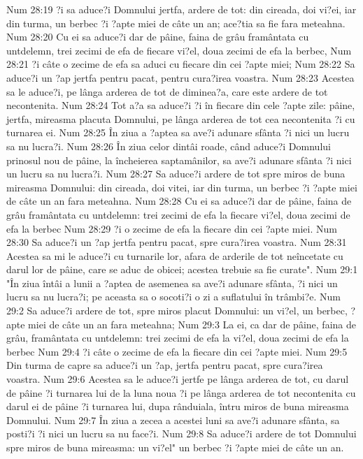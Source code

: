 Num 28:19  ?i sa aduce?i Domnului jertfa, ardere de tot: din cireada, doi vi?ei, iar din turma, un berbec ?i ?apte miei de câte un an; ace?tia sa fie fara meteahna.
Num 28:20  Cu ei sa aduce?i dar de pâine, faina de grâu framântata cu untdelemn, trei zecimi de efa de fiecare vi?el, doua zecimi de efa la berbec,
Num 28:21  ?i câte o zecime de efa sa aduci cu fiecare din cei ?apte miei;
Num 28:22  Sa aduce?i un ?ap jertfa pentru pacat, pentru cura?irea voastra.
Num 28:23  Acestea sa le aduce?i, pe lânga arderea de tot de diminea?a, care este ardere de tot necontenita.
Num 28:24  Tot a?a sa aduce?i ?i în fiecare din cele ?apte zile: pâine, jertfa, mireasma placuta Domnului, pe lânga arderea de tot cea necontenita ?i cu turnarea ei.
Num 28:25  În ziua a ?aptea sa ave?i adunare sfânta ?i nici un lucru sa nu lucra?i.
Num 28:26  În ziua celor dintâi roade, când aduce?i Domnului prinosul nou de pâine, la încheierea saptamânilor, sa ave?i adunare sfânta ?i nici un lucru sa nu lucra?i.
Num 28:27  Sa aduce?i ardere de tot spre miros de buna mireasma Domnului: din cireada, doi vitei, iar din turma, un berbec ?i ?apte miei de câte un an fara meteahna.
Num 28:28  Cu ei sa aduce?i dar de pâine, faina de grâu framântata cu untdelemn: trei zecimi de efa la fiecare vi?el, doua zecimi de efa la berbec
Num 28:29  ?i o zecime de efa la fiecare din cei ?apte miei.
Num 28:30  Sa aduce?i un ?ap jertfa pentru pacat, spre cura?irea voastra.
Num 28:31  Acestea sa mi le aduce?i cu turnarile lor, afara de arderile de tot neîncetate cu darul lor de pâine, care se aduc de obicei; acestea trebuie sa fie curate".
Num 29:1  "În ziua întâi a lunii a ?aptea de asemenea sa ave?i adunare sfânta, ?i nici un lucru sa nu lucra?i; pe aceasta sa o socoti?i o zi a suflatului în trâmbi?e.
Num 29:2  Sa aduce?i ardere de tot, spre miros placut Domnului: un vi?el, un berbec, ?apte miei de câte un an fara meteahna;
Num 29:3  La ei, ca dar de pâine, faina de grâu, framântata cu untdelemn: trei zecimi de efa la vi?el, doua zecimi de efa la berbec
Num 29:4  ?i câte o zecime de efa la fiecare din cei ?apte miei.
Num 29:5  Din turma de capre sa aduce?i un ?ap, jertfa pentru pacat, spre cura?irea voastra.
Num 29:6  Acestea sa le aduce?i jertfe pe lânga arderea de tot, cu darul de pâine ?i turnarea lui de la luna noua ?i pe lânga arderea de tot necontenita cu darul ei de pâine ?i turnarea lui, dupa rânduiala, întru miros de buna mireasma Domnului.
Num 29:7  În ziua a zecea a acestei luni sa ave?i adunare sfânta, sa posti?i ?i nici un lucru sa nu face?i.
Num 29:8  Sa aduce?i ardere de tot Domnului spre miros de buna mireasma: un vi?el" un berbec ?i ?apte miei de câte un an.

